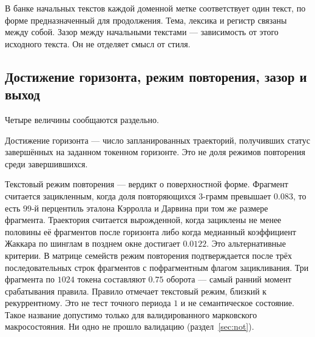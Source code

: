 \documentclass[10pt]{article}
\begin{document}
В банке начальных текстов каждой доменной метке соответствует один текст,
по форме предназначенный для продолжения.
Тема, лексика и регистр связаны между собой.
Зазор между начальными текстами --- зависимость от этого исходного текста.
Он не отделяет смысл от стиля. %

\subsection{Достижение горизонта, режим повторения, зазор и выход}
\label{sec:measures}

Четыре величины сообщаются раздельно.

Достижение горизонта --- число запланированных траекторий,
получивших статус завершённых на заданном токенном горизонте.
Это не доля режимов повторения среди завершившихся.

Текстовый режим повторения --- вердикт о поверхностной форме.
Фрагмент считается зацикленным, когда доля повторяющихся $3$-грамм
превышает $0.083$, то есть $99$-й перцентиль эталона Кэрролла и Дарвина
при том же размере фрагмента. %
Траектория считается вырожденной, когда зациклены не менее половины
её фрагментов после горизонта либо когда медианный коэффициент Жаккара
по шинглам в позднем окне достигает $0.0122$. %
Это альтернативные критерии.
В матрице семейств режим повторения подтверждается после трёх
последовательных строк фрагментов с пофрагментным флагом зацикливания.
Три фрагмента по $1024$ токена составляют $0.75$ оборота ---
самый ранний момент срабатывания правила. %
Правило отмечает текстовый режим, близкий к рекуррентному.
Это не тест точного периода $1$ и не семантическое состояние.
Такое название допустимо только для валидированного марковского макросостояния.
Ни одно не прошло валидацию (раздел~\ref{sec:not}).
\end{document}
